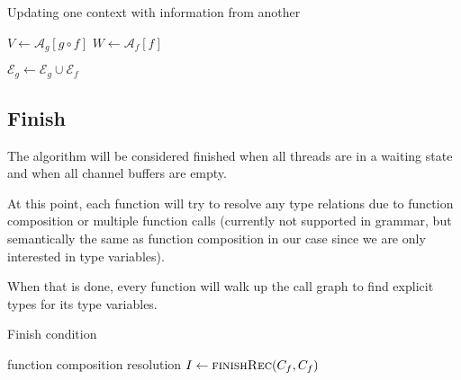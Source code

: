 \documentclass[10pt]{article}
\begin{document}
\begin{algorithm}
	\caption{Updating one context with information from another}
	\begin{algorithmic}[1]
		\Statex
		 
		\State $V \gets \mathcal{A}_g[g \circ f]$ 
		\State $W \gets \mathcal{A}_f[f]$
				\State {}

		\EndFor
				\State {}
		\EndIf
		\State	
		\State {}
			\State {}
			\EndIf
		\EndFor
		\State $\mathcal{E}_g \gets \mathcal{E}_g \cup \mathcal{E}_f$
		\EndFunction
	\end{algorithmic}
\end{algorithm}

\subsection{Finish}

The algorithm will be considered finished when all threads are in a waiting
state and when all channel buffers are empty.

At this point, each function will try to resolve any type relations due to
function composition or multiple function calls (currently not supported in
grammar, but semantically the same as function composition in our case since we
are only interested in type variables).

When that is done, every function will walk up the call graph to find explicit
types for its type variables.

\begin{algorithm}
	\caption{Finish condition}
	\begin{algorithmic}[1]
		\State function composition resolution 
			\State $I \gets \Call{finishRec}{C_f, C_f}$
		\EndFunction
	\end{algorithmic}
\end{algorithm}
\end{document}
